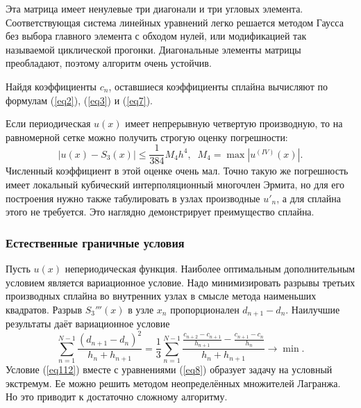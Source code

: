 \documentclass[
11pt,
master, %
subf, %
href, %
colorlinks=true, %
times, %
]{disser}
\begin{document}
Эта матрица имеет ненулевые три диагонали и три угловых элемента. Соответствующая система линейных уравнений легко решается методом Гаусса без выбора главного элемента с обходом нулей, или модификацией так называемой циклической прогонки. Диагональные элементы матрицы преобладают, поэтому алгоритм очень устойчив.

Найдя коэффициенты $c_n$, оставшиеся коэффициенты сплайна вычисляют по формулам (\ref{eq2}), (\ref{eq3}) и (\ref{eq7}).

Если периодическая $u(x)$ имеет непрерывную четвертую производную, то на равномерной сетке можно получить строгую оценку погрешности:
\begin{equation}\label{eq110}
  |u(x)-S_3(x)|\leq\frac{1}{384}M_4 h^4,\;\;M_4 = \max|u^{(IV)}(x)|.
\end{equation}
Численный коэффициент в этой оценке очень мал. Точно такую же погрешность имеет локальный кубический интерполяционный многочлен Эрмита, но для его построения нужно также табулировать в узлах производные $u'_n$, а для сплайна этого не требуется. Это наглядно демонстрирует преимущество сплайна.

\subsubsection{Естественные граничные условия}
Пусть $u(x)$ непериодическая функция. Наиболее оптимальным дополнительным условием является вариационное условие. Надо минимизировать разрывы третьих производных сплайна во внутренних узлах в смысле метода наименьших квадратов. Разрыв $S_3'''(x)$ в узле $x_n$ пропорционален $d_{n+1}-d_n$. Наилучшие результаты даёт вариационное условие
\begin{equation}\label{eq112}
  \sum_{n=1}^{N-1}\frac{(d_{n+1}-d_n)^2}{h_n+h_{n+1}} = \frac{1}{3}\sum_{n=1}^{N-1}\frac{\frac{c_{n+2}-c_{n+1}}{h_{n+1}}-\frac{c_{n+1}-c_n}{h_n}}{h_n+h_{n+1}} \rightarrow \min.
\end{equation}
Условие (\ref{eq112}) вместе с уравнениями (\ref{eq8}) образует задачу на условный экстремум. Ее можно решить методом неопределённых множителей Лагранжа. Но это приводит к достаточно сложному алгоритму.
\end{document}
